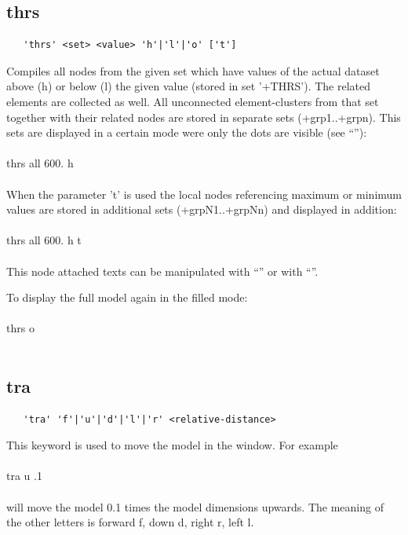 \documentclass{article}
\begin{document}
\subsection{\label{thrs}thrs}
\begin{verbatim}
   'thrs' <set> <value> 'h'|'l'|'o' ['t']
\end{verbatim}
Compiles all nodes from the given set which have values of the actual dataset above (h) or below (l) the given value (stored in set '+THRS'). The related elements are collected as well. All unconnected element-clusters from that set together with their related nodes are stored in separate sets (+grp1..+grpn). This sets are displayed in a certain mode were only the dots are visible (see ``''):\\\\thrs all 600. h\\\\
When the parameter 't' is used the local nodes referencing maximum or minimum values are stored in additional sets (+grpN1..+grpNn) and displayed in addition:\\\\thrs all 600. h t\\\\This node attached texts can be manipulated with ``'' or with  ``''.

To display the full model again in the filled mode:\\\\thrs o\\\\

\subsection{\label{tra}tra}
\begin{verbatim}
   'tra' 'f'|'u'|'d'|'l'|'r' <relative-distance>
\end{verbatim}
This keyword is used to move the model in the window. For example\\\\tra u .1\\\\will move the model 0.1 times the model dimensions upwards. The meaning of the other letters is forward f, down d, right r, left l. 
\end{document}
